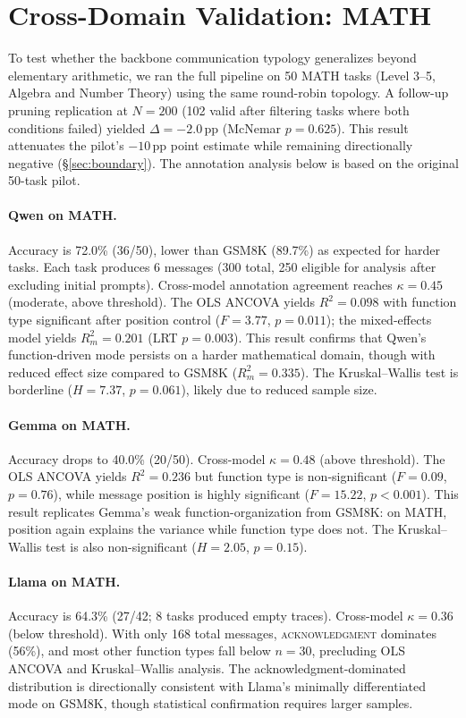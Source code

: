\section{Cross-Domain Validation: MATH}
\label{app:math}

To test whether the backbone communication typology generalizes beyond elementary arithmetic, we ran the full pipeline on 50 MATH tasks (Level 3--5, Algebra and Number Theory) using the same round-robin topology. A follow-up pruning replication at $N{=}200$ (102 valid after filtering tasks where both conditions failed) yielded $\Delta = -2.0$\,pp (McNemar $p = 0.625$). This result attenuates the pilot's $-10$\,pp point estimate while remaining directionally negative (\S\ref{sec:boundary}). The annotation analysis below is based on the original 50-task pilot.

\paragraph{Qwen on MATH.} Accuracy is 72.0\% (36/50), lower than GSM8K (89.7\%) as expected for harder tasks. Each task produces 6 messages (300 total, 250 eligible for analysis after excluding initial prompts). Cross-model annotation agreement reaches $\kappa = 0.45$ (moderate, above threshold). The OLS ANCOVA yields $R^2 = 0.098$ with function type significant after position control ($F = 3.77$, $p = 0.011$); the mixed-effects model yields $R^2_m = 0.201$ (LRT $p = 0.003$). This result confirms that Qwen's function-driven mode persists on a harder mathematical domain, though with reduced effect size compared to GSM8K ($R^2_m = 0.335$). The Kruskal--Wallis test is borderline ($H = 7.37$, $p = 0.061$), likely due to reduced sample size.

\paragraph{Gemma on MATH.} Accuracy drops to 40.0\% (20/50). Cross-model $\kappa = 0.48$ (above threshold). The OLS ANCOVA yields $R^2 = 0.236$ but function type is non-significant ($F = 0.09$, $p = 0.76$), while message position is highly significant ($F = 15.22$, $p < 0.001$). This result replicates Gemma's weak function-organization from GSM8K: on MATH, position again explains the variance while function type does not. The Kruskal--Wallis test is also non-significant ($H = 2.05$, $p = 0.15$).

\paragraph{Llama on MATH.} Accuracy is 64.3\% (27/42; 8 tasks produced empty traces). Cross-model $\kappa = 0.36$ (below threshold). With only 168 total messages, \textsc{acknowledgment} dominates (56\%), and most other function types fall below $n = 30$, precluding OLS ANCOVA and Kruskal--Wallis analysis. The acknowledgment-dominated distribution is directionally consistent with Llama's minimally differentiated mode on GSM8K, though statistical confirmation requires larger samples.

